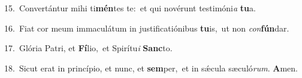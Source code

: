 {\numbfont\textcolor{\numbcolor}{15.}}~Convertántur mihi ti\-\textbf{mén}\-tes te:~\star et qui novérunt testimóni\textit{a} \textbf{tu}\-a.\par
{\numbfont\textcolor{\numbcolor}{16.}}~Fiat cor meum immaculátum in justificatiónibus \textbf{tu}\-is,~\star ut non \textit{con}\-\textbf{fún}dar.\par
{\numbfont\textcolor{\numbcolor}{17.}}~Glória Patri, et \textbf{Fí}\-lio,~\star et Spirítu\textit{i} \textbf{Sanc}\-to.\par
{\numbfont\textcolor{\numbcolor}{18.}}~Sicut erat in princípio, et nunc, et \textbf{sem}\-per,~\star et in sǽcula sæculó\-\textit{rum}\-. \textbf{A}\-men.\par

